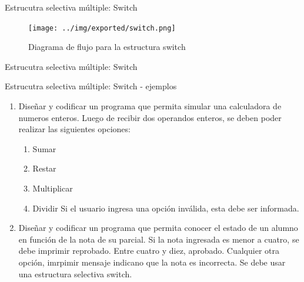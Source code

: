 \documentclass[xcolor=pdftex,table,11pt]{beamer}
\begin{document}
\begin{frame}{Estrucutra selectiva múltiple: Switch}

\begin{figure}

\texttt{[image: ../img/exported/switch.png]}
\caption{Diagrama de flujo para la estructura switch}
\end{figure}
\end{frame}


\begin{frame}{Estrucutra selectiva múltiple: Switch}
\codesetstylefrombeamer
{}
\end{frame}


\begin{frame}{Estrucutra selectiva múltiple: Switch - ejemplos}
 \begin{enumerate}
   
     	\item Diseñar y codificar un programa que permita simular una calculadora de numeros enteros.
     	Luego de recibir dos operandos enteros, se deben poder realizar las siguientes opciones:
     	 \begin{enumerate}
     	 \item Sumar
		 \item Restar
		\item Multiplicar
		\item Dividir
	   	Si el usuario ingresa una opción inválida, esta debe ser informada.
     	 \end{enumerate}

\href{https://github.com/danis963/informaticaI_IUA/blob/main/c/src/1-3_switch_case_calculadora.c}{}



     	\item Diseñar y codificar un programa que permita conocer el estado de un alumno en función de la nota de su parcial. Si la nota ingresada es menor a cuatro, se debe imprimir reprobado. Entre cuatro y diez, aprobado. Cualquier otra opción, imrpimir mensaje indicano que la nota es incorrecta. Se debe usar una estructura selectiva switch.
     	
	\href{https://github.com/danis963/informaticaI_IUA/blob/main/c/src/1-3_switch_case_notas.c}{}

   
   \end{enumerate}
   

\end{frame}
\end{document}
